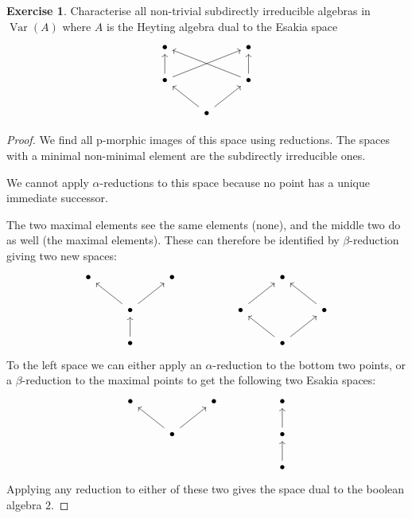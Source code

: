 \documentclass{article}
\DeclareMathOperator{\var}{Var}
\theoremstyle{definition}
\newtheorem{question}{Exercise}
\begin{document}
\begin{question}
    Characterise all non-trivial subdirectly irreducible algebras in \(\var(A)\)
    where \(A\) is the Heyting algebra dual to the Esakia space
    \[
        \begin{tikzcd}[ampersand replacement=\&]
            \bullet \&\& \bullet \\
            \bullet \&\& \bullet \\
            \& \bullet
            \arrow[from=2-1, to=1-1]
            \arrow[from=2-3, to=1-3]
            \arrow[from=2-1, to=1-3]
            \arrow[from=2-3, to=1-1]
            \arrow[from=3-2, to=2-1]
            \arrow[from=3-2, to=2-3]
        \end{tikzcd}
    \]

    \begin{proof}
        We find all p-morphic images of this space using reductions. The spaces
        with a minimal non-minimal element are the subdirectly irreducible ones.

        We cannot apply \(\alpha\)-reductions to this space because no point has
        a unique immediate successor.

        The two maximal elements see the same elements (none), and the middle
        two do as well (the maximal elements). These can therefore be identified
        by \(\beta\)-reduction giving two new spaces:
        \[
            \begin{tikzcd}[ampersand replacement=\&]
                \bullet \&\& \bullet \&\&\& \bullet \\
                \& \bullet \&\&\& \bullet \&\& \bullet \\
                \& \bullet \&\&\&\& \bullet
                \arrow[from=3-2, to=2-2]
                \arrow[from=2-2, to=1-1]
                \arrow[from=2-2, to=1-3]
                \arrow[from=2-5, to=1-6]
                \arrow[from=2-7, to=1-6]
                \arrow[from=3-6, to=2-5]
                \arrow[from=3-6, to=2-7]
            \end{tikzcd}
        \]
        To the left space we can either apply an \(\alpha\)-reduction to the
        bottom two points, or a \(\beta\)-reduction to the maximal points
        to get the following two Esakia spaces:
        \[
            \begin{tikzcd}[ampersand replacement=\&]
                \bullet \&\& \bullet \&\& \bullet \\
                \& \bullet \&\&\& \bullet \\
                \&\&\&\& \bullet
                \arrow[from=2-2, to=1-1]
                \arrow[from=2-2, to=1-3]
                \arrow[from=3-5, to=2-5]
                \arrow[from=2-5, to=1-5]
            \end{tikzcd}
        \]
        Applying any reduction to either of these two gives the space dual to
        the boolean algebra \(2\).


\end{proof}
\end{question}
\end{document}
